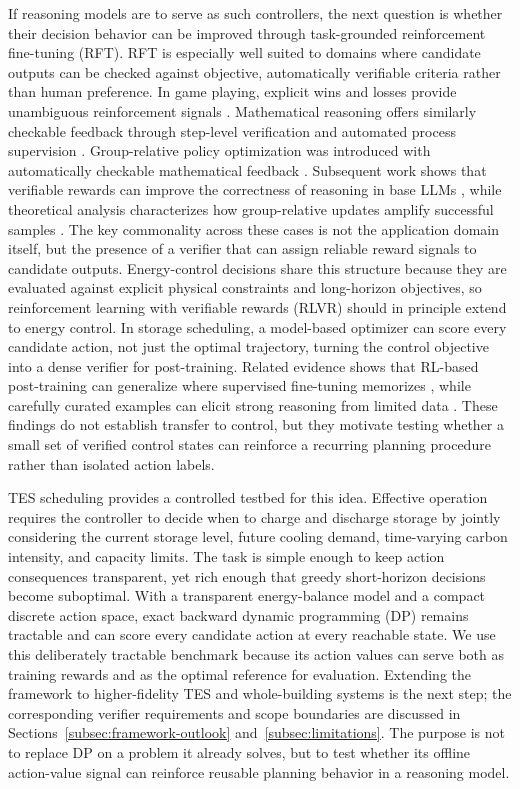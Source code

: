 \documentclass[11pt]{article}
\begin{document}
If reasoning models are to serve as such controllers, the next question is whether their decision behavior can be improved through task-grounded reinforcement fine-tuning (RFT). RFT is especially well suited to domains where candidate outputs can be checked against objective, automatically verifiable criteria rather than human preference. In game playing, explicit wins and losses provide unambiguous reinforcement signals \cite{ref:silver2016_alphago_nature}. Mathematical reasoning offers similarly checkable feedback through step-level verification \cite{ref:lightman2023_verify_step} and automated process supervision \cite{ref:luo2024_automated_process_supervision}. Group-relative policy optimization was introduced with automatically checkable mathematical feedback \cite{deepseekmath2024}. Subsequent work shows that verifiable rewards can improve the correctness of reasoning in base LLMs \cite{ref:wen2025_rlvr_correct_reasoning}, while theoretical analysis characterizes how group-relative updates amplify successful samples \cite{mroueh2025rlvr}. The key commonality across these cases is not the application domain itself, but the presence of a verifier that can assign reliable reward signals to candidate outputs. Energy-control decisions share this structure because they are evaluated against explicit physical constraints and long-horizon objectives, so reinforcement learning with verifiable rewards (RLVR) should in principle extend to energy control. In storage scheduling, a model-based optimizer can score every candidate action, not just the optimal trajectory, turning the control objective into a dense verifier for post-training. Related evidence shows that RL-based post-training can generalize where supervised fine-tuning memorizes \cite{ref:chu2025_sft_rl}, while carefully curated examples can elicit strong reasoning from limited data \cite{ref:ye2025_limo}. These findings do not establish transfer to control, but they motivate testing whether a small set of verified control states can reinforce a recurring planning procedure rather than isolated action labels.

TES scheduling provides a controlled testbed for this idea. Effective operation requires the controller to decide when to charge and discharge storage by jointly considering the current storage level, future cooling demand, time-varying carbon intensity, and capacity limits. The task is simple enough to keep action consequences transparent, yet rich enough that greedy short-horizon decisions become suboptimal. With a transparent energy-balance model and a compact discrete action space, exact backward dynamic programming (DP) remains tractable and can score every candidate action at every reachable state. We use this deliberately tractable benchmark because its action values can serve both as training rewards and as the optimal reference for evaluation. Extending the framework to higher-fidelity TES and whole-building systems is the next step; the corresponding verifier requirements and scope boundaries are discussed in Sections~\ref{subsec:framework-outlook} and~\ref{subsec:limitations}. The purpose is not to replace DP on a problem it already solves, but to test whether its offline action-value signal can reinforce reusable planning behavior in a reasoning model.
\end{document}
